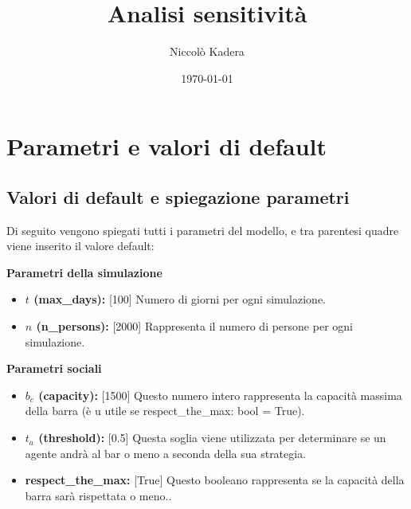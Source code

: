 \documentclass{article}
\title{Analisi sensitività}
\author{Niccolò Kadera}
\date{\today}
\begin{document}
{\selectfont
\maketitle

\section{Parametri e valori di default}

\subsection{Valori di default e spiegazione parametri}
Di seguito vengono spiegati tutti i parametri del modello, e tra parentesi quadre viene inserito il valore default: \newline

    \textbf{Parametri della simulazione}
    \begin{itemize}
        \item \textbf{$t$ (max\_days):} [100] Numero di giorni per ogni simulazione.
        \item \textbf{$n$ (n\_persons):} [2000] Rappresenta il numero di persone per ogni simulazione.\newline
    \end{itemize}

    \textbf{Parametri sociali}
    \begin{itemize}
        \item \textbf{$b_{c}$ (capacity):} [1500] Questo numero intero rappresenta la capacità massima della barra (è u utile se respect\_the\_max: bool = True).
        \item \textbf{$t_a$ (threshold): } [0.5] Questa soglia viene utilizzata per determinare se un agente andrà al bar o meno a seconda della sua strategia.
        \item \textbf{respect\_the\_max: } [True] Questo booleano rappresenta se la capacità della barra sarà rispettata o meno..\newline
    \end{itemize}

}
\end{document}
